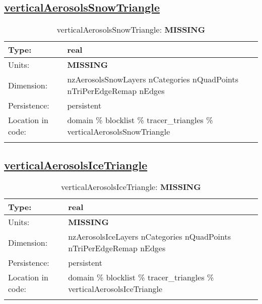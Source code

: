 \subsection[verticalAerosolsSnowTriangle]{\hyperref[sec:var_tab_tracer_triangles]{verticalAerosolsSnowTriangle}}
\label{subsec:var_sec_tracer_triangles_verticalAerosolsSnowTriangle}
\begin{center}
\begin{longtable}{| p{2.0in} | p{4.0in} |}
        \hline 
        Type: & real \\
        \hline 
        Units: & {\bf \color{red} MISSING} \\
        \hline 
        Dimension: & nzAerosolsSnowLayers nCategories nQuadPoints nTriPerEdgeRemap nEdges \\
        \hline 
        Persistence: & persistent \\
        \hline 
         Location in code: & domain \% blocklist \% tracer\_triangles \% verticalAerosolsSnowTriangle \\
         \hline 
    \caption{verticalAerosolsSnowTriangle: {\bf \color{red} MISSING}}
\end{longtable}
\end{center}
\subsection[verticalAerosolsIceTriangle]{\hyperref[sec:var_tab_tracer_triangles]{verticalAerosolsIceTriangle}}
\label{subsec:var_sec_tracer_triangles_verticalAerosolsIceTriangle}
\begin{center}
\begin{longtable}{| p{2.0in} | p{4.0in} |}
        \hline 
        Type: & real \\
        \hline 
        Units: & {\bf \color{red} MISSING} \\
        \hline 
        Dimension: & nzAerosolsIceLayers nCategories nQuadPoints nTriPerEdgeRemap nEdges \\
        \hline 
        Persistence: & persistent \\
        \hline 
         Location in code: & domain \% blocklist \% tracer\_triangles \% verticalAerosolsIceTriangle \\
         \hline 
    \caption{verticalAerosolsIceTriangle: {\bf \color{red} MISSING}}
\end{longtable}
\end{center}
